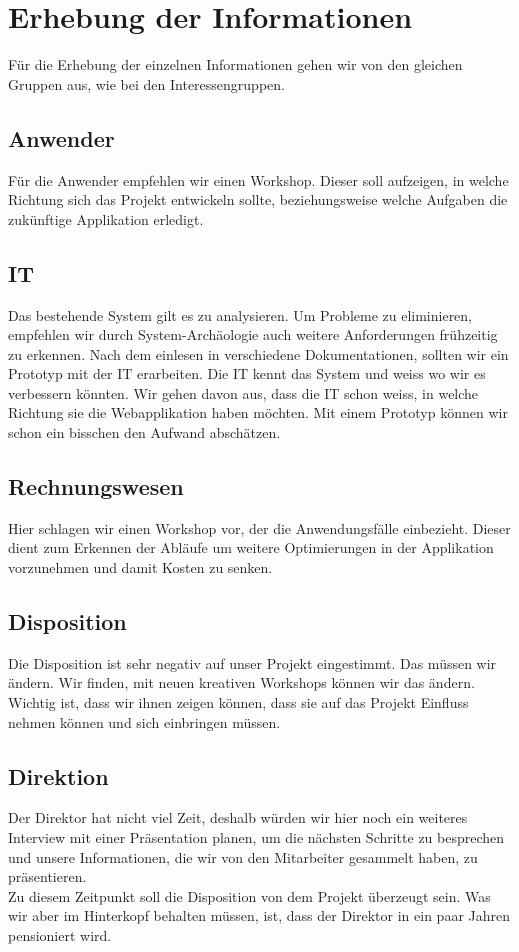 \section{Erhebung der Informationen}
Für die Erhebung der einzelnen Informationen gehen wir von den gleichen Gruppen aus, wie bei den Interessengruppen.
\subsection{Anwender}
Für die Anwender empfehlen wir einen Workshop. Dieser soll aufzeigen, in welche Richtung sich das Projekt entwickeln sollte, beziehungsweise welche Aufgaben die zukünftige Applikation erledigt.
%
\subsection{IT}
Das bestehende System gilt es zu analysieren. Um Probleme zu eliminieren, empfehlen wir durch System-Archäologie auch weitere Anforderungen frühzeitig zu erkennen.
Nach dem einlesen in verschiedene Dokumentationen, sollten wir ein Prototyp mit der IT erarbeiten. Die IT kennt das System und weiss wo wir es verbessern könnten. Wir gehen davon aus, dass die IT schon weiss, in welche Richtung sie die Webapplikation haben möchten. Mit einem Prototyp können wir schon ein bisschen den Aufwand abschätzen.
%
\subsection{Rechnungswesen}
Hier schlagen wir einen Workshop vor, der die Anwendungsfälle einbezieht. 
Dieser dient zum Erkennen der Abläufe um weitere Optimierungen in der Applikation vorzunehmen und damit Kosten zu senken.
%
\subsection{Disposition}
Die Disposition ist sehr negativ auf unser Projekt eingestimmt. Das müssen wir ändern. Wir finden, mit neuen kreativen Workshops können wir das ändern. Wichtig ist, dass wir ihnen zeigen können, dass sie 
auf das Projekt Einfluss nehmen können und sich einbringen müssen.
%
\subsection{Direktion}
Der Direktor hat nicht viel Zeit, deshalb würden wir hier noch ein weiteres Interview mit einer Präsentation planen, um die nächsten Schritte zu besprechen und unsere Informationen, die wir von den Mitarbeiter gesammelt haben, zu präsentieren.\\
Zu diesem Zeitpunkt soll die Disposition von dem Projekt überzeugt sein. Was wir aber im Hinterkopf behalten müssen, ist, dass der Direktor in ein paar Jahren pensioniert wird.
%
